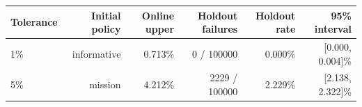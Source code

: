 \begin{tabular}{lrrrrr}
\toprule
Tolerance & Initial policy & Online upper & Holdout failures & Holdout rate & 95\% interval \\
\midrule
1\% & informative & 0.713\% & 0 / 100000 & 0.000\% & [0.000, 0.004]\% \\
5\% & mission & 4.212\% & 2229 / 100000 & 2.229\% & [2.138, 2.322]\% \\
\bottomrule
\end{tabular}
